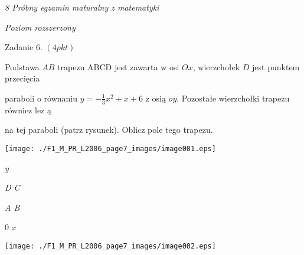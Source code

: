 \documentclass[a4paper,12pt]{article}
\begin{document}
{\it 8 Próbny egzamin maturalny z matematyki}

{\it Poziom rozszerzony}

Zadanie 6. $(4pkt)$

Podstawa $AB$ trapezu ABCD jest zawarta w osi $Ox$, wierzchołek $D$ jest punktem przecięcia

paraboli o równaniu $y=-\displaystyle \frac{1}{3}x^{2}+x+6$ z osią $oy$. Pozostałe wierzchołki trapezu równiez $\mathrm{l}\mathrm{e}\dot{\mathrm{z}}$ ą

na tej paraboli (patrz rysunek). Oblicz pole tego trapezu.
\begin{center}
\texttt{[image: ./F1\_M\_PR\_L2006\_page7\_images/image001.eps]}
\end{center}
{\it y}

{\it D C}

{\it A  B}

0  {\it x}
\begin{center}
\texttt{[image: ./F1\_M\_PR\_L2006\_page7\_images/image002.eps]}
\end{center}
\end{document}
